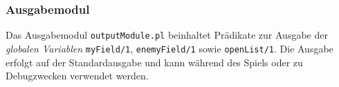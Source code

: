 \subsubsection{Ausgabemodul}
	Das Ausgabemodul \texttt{outputModule.pl} beinhaltet Prädikate zur Ausgabe der \textit{globalen Variablen} \texttt{myField/1},
	\texttt{enemyField/1} sowie \texttt{openList/1}. Die Ausgabe erfolgt auf der Standardausgabe und kann während des Spiels oder zu
	Debugzwecken verwendet werden.
	

